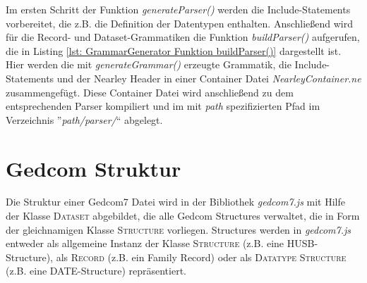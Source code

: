 Im ersten Schritt der Funktion \textit{generateParser()} werden die Include-Statements vorbereitet, die z.B. die Definition der Datentypen enthalten. Anschließend wird für die Record- und Dataset-Grammatiken die Funktion \textit{buildParser()} aufgerufen, die in Listing \ref{lst: GrammarGenerator Funktion buildParser()} dargestellt ist. Hier werden die mit \textit{generateGrammar()} erzeugte Grammatik, die Include-Statements und der Nearley Header in einer Container Datei \textit{NearleyContainer.ne} zusammengefügt. Diese Container Datei wird anschließend zu dem entsprechenden Parser kompiliert und im mit \textit{path} spezifizierten Pfad im Verzeichnis ''\textit{path/parser/}`` abgelegt.
\vspace{0.8em}
\section{Gedcom Struktur}
\label{sec: Implementierung - Gedcom Struktur}
Die Struktur einer Gedcom7 Datei wird in der Bibliothek \textit{gedcom7.js} mit Hilfe der Klasse \textsc{Dataset} abgebildet, die alle Gedcom Structures verwaltet, die in Form der gleichnamigen Klasse \textsc{Structure} vorliegen. Structures werden in \textit{gedcom7.js} entweder als allgemeine Instanz der Klasse \textsc{Structure} (z.B. eine HUSB-Structure), als \textsc{Record} (z.B. ein Family Record) oder als \textsc{Datatype Structure} (z.B. eine DATE-Structure) repräsentiert. 

